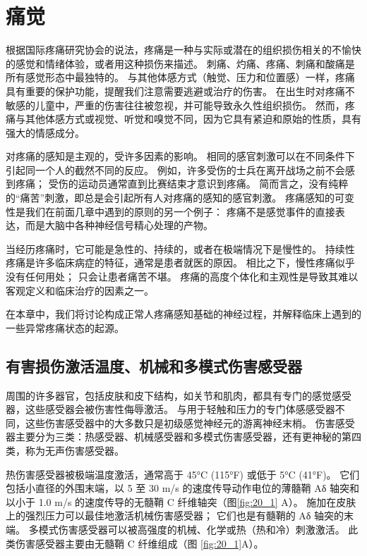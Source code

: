 \chapter{痛觉} \label{chap:chap20}
根据国际疼痛研究协会的说法，疼痛是一种与实际或潜在的组织损伤相关的不愉快的感觉和情绪体验，或者用这种损伤来描述。 
刺痛、灼痛、疼痛、刺痛和酸痛是所有感觉形态中最独特的。 
与其他体感方式（触觉、压力和位置感）一样，疼痛具有重要的保护功能，提醒我们注意需要逃避或治疗的伤害。 
在出生时对疼痛不敏感的儿童中，严重的伤害往往被忽视，并可能导致永久性组织损伤。 
然而，疼痛与其他体感方式或视觉、听觉和嗅觉不同，因为它具有紧迫和原始的性质，具有强大的情感成分。


对疼痛的感知是主观的，受许多因素的影响。 
相同的感官刺激可以在不同条件下引起同一个人的截然不同的反应。 
例如，许多受伤的士兵在离开战场之前不会感到疼痛； 
受伤的运动员通常直到比赛结束才意识到疼痛。 
简而言之，没有纯粹的“痛苦”刺激，即总是会引起所有人对疼痛的感知的感官刺激。 
疼痛感知的可变性是我们在前面几章中遇到的原则的另一个例子：
疼痛不是感觉事件的直接表达，而是大脑中各种神经信号精心处理的产物。


当经历疼痛时，它可能是急性的、持续的，或者在极端情况下是慢性的。 
持续性疼痛是许多临床病症的特征，通常是患者就医的原因。 
相比之下，慢性疼痛似乎没有任何用处； 
只会让患者痛苦不堪。 
疼痛的高度个体化和主观性是导致其难以客观定义和临床治疗的因素之一。


在本章中，我们将讨论构成正常人疼痛感知基础的神经过程，并解释临床上遇到的一些异常疼痛状态的起源。


\section{有害损伤激活温度、机械和多模式伤害感受器}
周围的许多器官，包括皮肤和皮下结构，如关节和肌肉，都具有专门的感觉感受器，这些感受器会被伤害性侮辱激活。 
与用于轻触和压力的专门体感感受器不同，这些伤害感受器中的大多数只是初级感觉神经元的游离神经末梢。 
伤害感受器主要分为三类：热感受器、机械感受器和多模式伤害感受器，还有更神秘的第四类，称为无声伤害感受器。


热伤害感受器被极端温度激活，通常高于 45°C (115°F) 或低于 5°C (41°F)。 
它们包括小直径的外围末端，以 5 至 30 m/s 的速度传导动作电位的薄髓鞘 Aδ 轴突和以小于 1.0 m/s 的速度传导的无髓鞘 C 纤维轴突（图\ref{fig:20_1} A）。 
施加在皮肤上的强烈压力可以最佳地激活机械伤害感受器；
它们也是有髓鞘的 Aδ 轴突的末端。
多模式伤害感受器可以被高强度的机械、化学或热（热和冷）刺激激活。
此类伤害感受器主要由无髓鞘 C 纤维组成（图 \ref{fig:20_1}A）。

